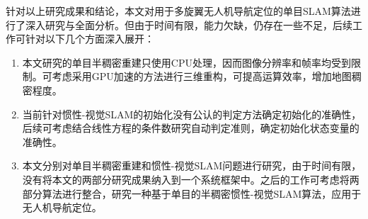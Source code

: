 \begin{conclusion}
针对以上研究成果和结论，本文对用于多旋翼无人机导航定位的单目SLAM算法进行了深入研究与全面分析。但由于时间有限，能力欠缺，仍存在一些不足，后续工作可针对以下几个方面深入展开：
\begin{enumerate}  [label={(\arabic*)}]
\item 本文研究的单目半稠密重建只使用CPU处理，因而图像分辨率和帧率均受到限制。可考虑采用GPU加速的方法进行三维重构，可提高运算效率，增加地图稠密程度。
\item 当前针对惯性-视觉SLAM的初始化没有公认的判定方法确定初始化的准确性，后续可考虑结合线性方程的条件数研究自动判定准则，确定初始化状态变量的准确性。
\item 本文分别对单目半稠密重建和惯性-视觉SLAM问题进行研究，由于时间有限，没有将本文的两部分研究成果纳入到一个系统框架中。之后的工作可考虑将两部分算法进行整合，研究一种基于单目的半稠密惯性-视觉SLAM算法，应用于无人机导航定位。
\end{enumerate}





\end{conclusion}